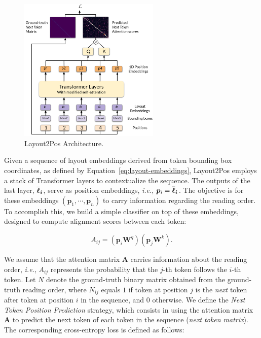 \begin{figure}
  \centering
  \includegraphics[width=0.6\textwidth]{images/chapter4/Layout2Pos.pdf}
  \caption{Layout2Pos Architecture.}
  \label{fig:layout2pos-module}
\end{figure}

Given a sequence of layout embeddings derived from token bounding box coordinates, as defined by Equation~\ref{eq:layout-embeddings}, Layout2Pos employs a stack of Transformer layers to contextualize the sequence. The outputs of the last layer, $\bm{\overline{\boldsymbol{\ell}}_i}$, serve as position embeddings, \textit{i.e.}, $\bm{p}_i = \bm{\overline{\boldsymbol{\ell}}_i}$. The objective is for these embeddings $(\bm{p}_1, \cdots, \bm{p}_n)$ to carry information regarding the reading order. To accomplish this, we build a simple classifier on top of these embeddings, designed to compute alignment scores between each token:

\begin{equation}
  A_{ij} = \left(\bm{p}_i \bm{W}^q\right)\left(\bm{p}_j \bm{W}^k\right).
\end{equation}

\noindent We assume that the attention matrix $\bm{A}$ carries information about the reading order, \textit{i.e.}, $A_{ij}$ represents the probability that the $j$-th token follows the $i$-th token. Let $N$ denote the ground-truth binary matrix obtained from the ground-truth reading order, where $N_{ij}$ equals $1$ if token at position $j$ is the \textit{next} token after token at position $i$ in the sequence, and $0$ otherwise. We define the \textit{Next Token Position Prediction} strategy, which consists in using the attention matrix $\bm{A}$ to predict the next token of each token in the sequence (\textit{next token matrix}). The corresponding cross-entropy loss is defined as follows:

